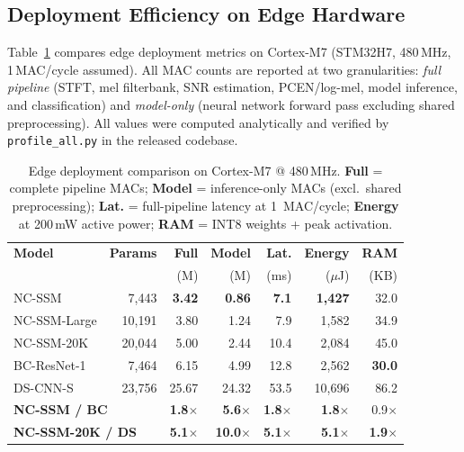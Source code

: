 \documentclass[journal]{IEEEtran}
\begin{document}
\subsection{Deployment Efficiency on Edge Hardware}
\label{sec:mcu_deploy}

Table~\ref{tab:mcu_deploy} compares edge deployment metrics on Cortex-M7 (STM32H7, 480\,MHz, 1\,MAC/cycle assumed).
All MAC counts are reported at two granularities: \emph{full pipeline} (STFT, mel filterbank, SNR estimation, PCEN/log-mel, model inference, and classification) and \emph{model-only} (neural network forward pass excluding shared preprocessing).
All values were computed analytically and verified by \texttt{profile\_all.py} in the released codebase.

\begin{table}[t]
\centering
\caption{Edge deployment comparison on Cortex-M7 @ 480\,MHz. \textbf{Full} = complete pipeline MACs; \textbf{Model} = inference-only MACs (excl.\ shared preprocessing); \textbf{Lat.} = full-pipeline latency at 1~MAC/cycle; \textbf{Energy} at 200\,mW active power; \textbf{RAM} = INT8 weights + peak activation.}
\label{tab:mcu_deploy}
\small
\setlength{\tabcolsep}{2.8pt}
\begin{tabular}{lrrrrrr}
\toprule
\textbf{Model} & \textbf{Params} & \textbf{Full} & \textbf{Model} & \textbf{Lat.} & \textbf{Energy} & \textbf{RAM} \\
               &                & (M)          & (M)           & (ms)         & ($\mu$J)       & (KB)        \\
\midrule
NC-SSM         & 7{,}443  & \textbf{3.42} & \textbf{0.86} & \textbf{7.1}  & \textbf{1{,}427}   & 32.0  \\
NC-SSM-Large   & 10{,}191 & 3.80 & 1.24 & 7.9  & 1{,}582   & 34.9  \\
NC-SSM-20K     & 20{,}044 & 5.00 & 2.44 & 10.4 & 2{,}084   & 45.0  \\
\midrule
BC-ResNet-1    & 7{,}464  & 6.15 & 4.99 & 12.8 & 2{,}562 & \textbf{30.0} \\
DS-CNN-S       & 23{,}756 & 25.67 & 24.32 & 53.5 & 10{,}696 & 86.2 \\
\midrule
\multicolumn{2}{l}{\textbf{NC-SSM / BC}} & \textbf{1.8$\times$} & \textbf{5.6$\times$} & \textbf{1.8$\times$} & \textbf{1.8$\times$} & 0.9$\times$ \\
\multicolumn{2}{l}{\textbf{NC-SSM-20K / DS}} & \textbf{5.1$\times$} & \textbf{10.0$\times$} & \textbf{5.1$\times$} & \textbf{5.1$\times$} & \textbf{1.9$\times$} \\
\bottomrule
\end{tabular}
\end{table}
\end{document}

